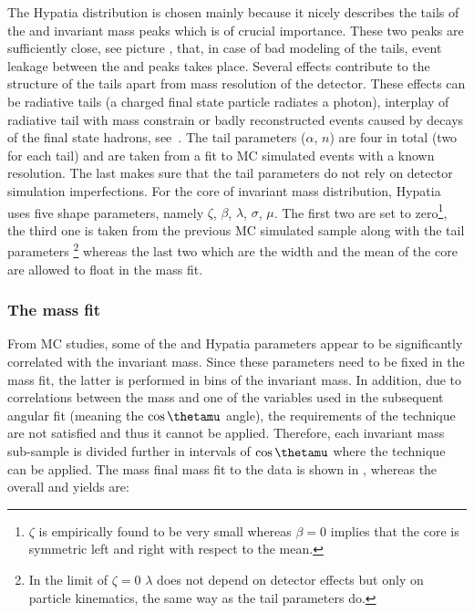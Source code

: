 The Hypatia distribution is chosen mainly because it nicely describes the tails of the \Bs and \Bd invariant mass peaks which is
of crucial importance. These two peaks are sufficiently close,
see picture , that, in case of bad modeling of the tails, event leakage between the \Bs and \Bd peaks 
takes place. Several effects contribute to the structure of the tails apart from mass resolution of the detector. These effects
can be radiative tails (a charged final state particle radiates a photon), interplay of radiative tail with \Jpsi mass constrain
or badly reconstructed events caused by decays of the final state hadrons, see~\cite{Santos:2013gra}. The tail parameters ($\alpha$, $n$)
are four in total (two for each tail) and are taken from a fit to MC simulated events with a known resolution. The last makes sure that
the tail parameters do not rely on detector simulation imperfections. 
For the core of invariant mass distribution, Hypatia uses five shape parameters, namely $\zeta$, $\beta$, $\lambda$, $\sigma$, $\mu$. 
The first two are set to zero\footnote{$\zeta$ is empirically found to be very small whereas
$\beta = 0$ implies that the core is symmetric left and right with respect to the mean.}, the third one is taken from the previous
MC simulated sample along with the tail parameters \footnote{In the limit of $\zeta = 0$ $\lambda$ does not depend on detector 
effects but only on particle kinematics, the same way as the tail parameters do.} whereas the last two which are the width and 
the mean of the core are allowed to float in the mass fit.

\subsubsection{The mass fit}
From MC studies, some of the \Bs and \Bd Hypatia parameters appear to be significantly correlated with the \mkpi invariant mass. 
Since these parameters need to be fixed in the mass fit, the latter is performed in bins of the
\mkpi invariant mass. In addition, due to correlations between the mass and one of the variables used in the subsequent angular fit 
(meaning the $\cos\thetamu$ angle), the requirements of the \sPlot technique are not satisfied and thus it cannot be applied. 
Therefore, each \mkpi invariant mass sub-sample is divided further in intervals of $\cos\thetamu$ where the \sPlot technique
can be applied.  The mass final mass fit to the data is shown in , whereas the overall \Bs and \Bd yields are:


